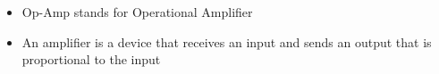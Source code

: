 \begin{itemize}
\item Op-Amp stands for Operational Amplifier
\item An amplifier is a device that receives an input and sends an output that is proportional to the input
\end{itemize}
